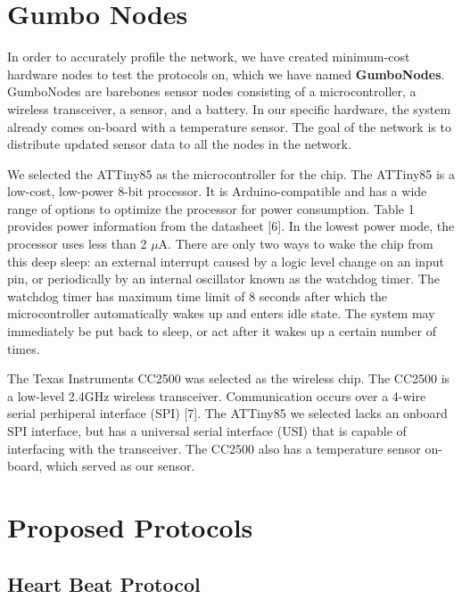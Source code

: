 \section{Gumbo Nodes}
\label{section:gumbo_node}

In order to accurately profile the network, we have created minimum-cost hardware nodes to test the protocols on, which we have named
\textbf{GumboNodes}.  GumboNodes are barebones sensor nodes consisting of a microcontroller, a wireless transceiver, a sensor, and a battery. In our specific hardware, the system already comes on-board with a temperature sensor.  The goal of the network is to distribute updated sensor data to all the nodes in the network.

We selected the ATTiny85 as the microcontroller for the chip. The ATTiny85 is a low-cost, low-power 8-bit processor. It is Arduino-compatible and has a wide range of options to optimize the processor for power consumption. Table 1 provides power information from the datasheet [6]. In the lowest power mode, the processor uses less than 2 $\mu$A. There are only two ways to wake the chip from this deep sleep: an external interrupt caused by a logic level change on an input pin, or periodically by an internal oscillator known as the watchdog timer. The watchdog timer has maximum time limit of 8 seconds after which the microcontroller automatically wakes up and enters idle state. The system may immediately be put back to sleep, or act after it wakes up a certain number of times.

The Texas Instruments CC2500 was selected as the wireless chip. The CC2500 is a low-level 2.4GHz wireless transceiver. Communication occurs over a 4-wire serial perhiperal interface (SPI) [7]. The ATTiny85 we selected lacks an onboard SPI interface, but has a universal serial interface (USI) that is capable of interfacing with the transceiver. The CC2500 also has a temperature sensor on-board, which served as our sensor. 


\section{Proposed Protocols}

\subsection{Heart Beat Protocol}
\label{section:heart_beat_protocol}

